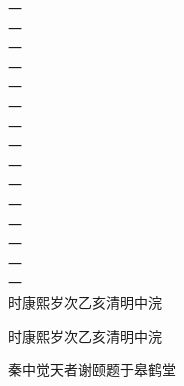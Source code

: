 \documentclass{ltc-guji}
\begin{document}
\begin{正文}

一\\
一\\
一\\
一\\
一\\
一\\
一\\
一\\
一\\
一\\
一\\
一\\
一\\
一\\
一\\
 时康熙岁次乙亥清明中浣

\newpage

时康熙岁次乙亥清明中浣

秦中觉天者谢颐题于皋鹤堂

\end{正文}
\end{document}
